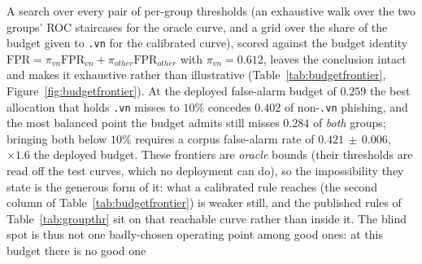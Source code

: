 A search over every pair of per-group thresholds (an exhaustive walk over the two groups' ROC staircases for the oracle curve, and a grid over the share of the budget given to \texttt{.vn} for the calibrated curve), scored against the budget identity $\mathrm{FPR} = \pi_{vn}\mathrm{FPR}_{vn} + \pi_{other}\mathrm{FPR}_{other}$ with $\pi_{vn} = 0.612$, leaves the conclusion intact and makes it exhaustive rather than illustrative (Table~\ref{tab:budgetfrontier}, Figure~\ref{fig:budgetfrontier}). At the deployed false-alarm budget of $0.259$ the best allocation that holds \texttt{.vn} misses to $10\%$ concedes $0.402$ of non-\texttt{.vn} phishing, and the most balanced point the budget admits still misses $0.284$ of \emph{both} groups; bringing both below $10\%$ requires a corpus false-alarm rate of $0.421\,\pm\,0.006$, $\times1.6$ the deployed budget. These frontiers are \emph{oracle} bounds (their thresholds are read off the test curves, which no deployment can do), so the impossibility they state is the generous form of it: what a calibrated rule reaches (the second column of Table~\ref{tab:budgetfrontier}) is weaker still, and the published rules of Table~\ref{tab:groupthr} sit on that reachable curve rather than inside it. The blind spot is thus not one badly-chosen operating point among good ones: at this budget there is no good one%
